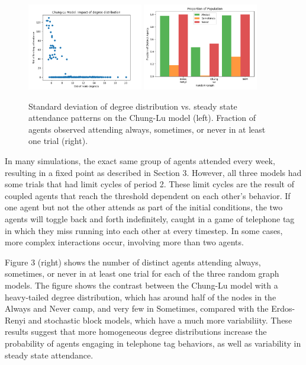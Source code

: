 \documentclass[12pt]{article}
\begin{document}
\begin{figure}
  \includegraphics[width=0.45\textwidth]{chung_lu_std.png}
  \includegraphics[width=0.45\textwidth]{always_sometimes_never.png}
  \caption{Standard deviation of degree distribution vs. steady state attendance patterns on the Chung-Lu model (left).  Fraction of agents observed attending always, sometimes, or never in at least one trial (right).}
\end{figure}

In many simulations, the exact same group of agents attended every week, resulting in a fixed point as described in Section 3.  However, all three models had some trials that had limit cycles of period 2.   These limit cycles are the result of coupled agents that reach the threshold dependent on each other's behavior.  If one agent but not the other attends as part of the initial conditions, the two agents will toggle back and forth indefinitely, caught in a game of telephone tag in which they miss running into each other at every timestep.  In some cases, more complex interactions occur, involving more than two agents.

Figure 3 (right) shows the number of distinct agents attending always, sometimes, or never in at least one trial for each of the three random graph models.  The figure shows the contrast between the Chung-Lu model with a heavy-tailed degree distribution, which has around half of the nodes in the Always and Never camp, and very few in Sometimes, compared with the Erdos-Renyi and stochastic block models, which have a much more variabiliity.  These results suggest that more homogeneous degree distributions increase the probability of agents engaging in telephone tag behaviors, as well as variability in steady state attendance.
\end{document}
